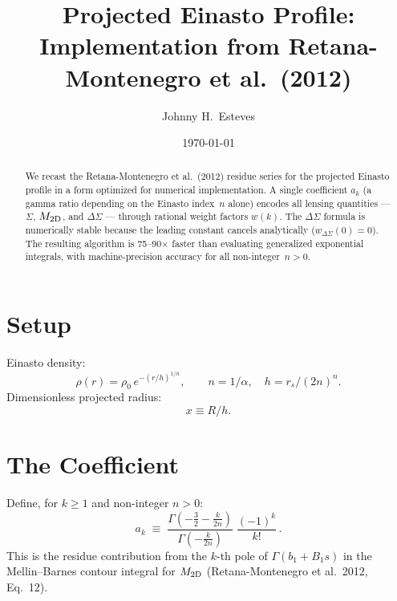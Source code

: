 \documentclass{article}
\title{Projected Einasto Profile:\\
Implementation from Retana-Montenegro et al.\ (2012)}
\author{Johnny H.~Esteves}
\date{\today}
\begin{document}
\maketitle

\begin{abstract}
We recast the Retana-Montenegro et al.\ (2012) residue series for the
projected Einasto profile in a form optimized for numerical implementation.
A single coefficient $a_k$ (a gamma ratio depending on the Einasto index~$n$
alone) encodes all lensing quantities --- $\Sigma$, $M_{\rm 2D}$, and
$\Delta\Sigma$ --- through rational weight factors $w(k)$. The $\Delta\Sigma$
formula is numerically stable because the leading constant cancels analytically
($w_{\Delta\Sigma}(0)=0$). The resulting algorithm is 75--90$\times$ faster
than evaluating generalized exponential integrals, with machine-precision
accuracy for all non-integer~$n>0$.
\end{abstract}

\section{Setup}

Einasto density:
\begin{equation}\label{eq:rho}
\rho(r)=\rho_0\,e^{-(r/h)^{1/n}}, \qquad
n=1/\alpha,\quad h=r_s/(2n)^n.
\end{equation}
Dimensionless projected radius:
\begin{equation}\label{eq:x}
x \equiv R/h.
\end{equation}

\section{The Coefficient}
\label{sec:coeff}

Define, for $k\ge1$ and non-integer $n>0$:
\begin{equation}\label{eq:ak}
\boxed{\;
a_k \;\equiv\;
\frac{\Gamma\!\left(-\tfrac{3}{2}-\tfrac{k}{2n}\right)}
     {\Gamma\!\left(-\tfrac{k}{2n}\right)}\;
\frac{(-1)^k}{k!}\,.
\;}
\end{equation}
This is the residue contribution from the $k$-th pole of
$\Gamma(b_1+B_1 s)$ in the Mellin--Barnes contour integral
for $M_{\rm 2D}$ (Retana-Montenegro et al.\ 2012, Eq.~12).
\end{document}
